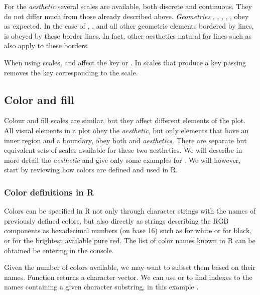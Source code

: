 \documentclass[krantz2]{krantz}\usepackage{knitr}%
\begin{document}
For the  \emph{aesthetic} several scales are available, both discrete and continuous. They do not differ much from those already described above. \emph{Geometries} , , , , ,  obey  as expected. In the case of , ,  and all other geometric elements bordered by lines,  is obeyed by these border lines. In fact, other aesthetics natural for lines such as  also apply to these borders.

When using  scales,  and  affect the key or . In scales that produce a key passing  removes the key corresponding to the scale.

\subsection{Color and fill}

Colour and fill scales are similar, but they affect different elements of the plot. All visual elements in a plot obey the  \emph{aesthetic}, but only elements that have an inner region and a boundary, obey both  and  \emph{aesthetics}. There are separate but equivalent sets of scales available for these two aesthetics. We will describe in more detail the  \emph{aesthetic} and give only some examples for . We will however, start by reviewing how colors are defined and used in R.

\subsubsection{Color definitions in R}\label{sec:plot:colors}
Colors can be specified in R not only through character strings with the names of previously defined colors, but also directly as strings describing the RGB components as hexadecimal numbers (on base 16) such as  for white or  for black, or  for the brightest available pure red. The list of color names known to R can be obtained be entering  in the console.

Given the number of colors available, we may want to subset them based on their names. Function  returns a character vector. We can use  or  to find indexes to the names containing a given character substring, in this example .
\end{document}
